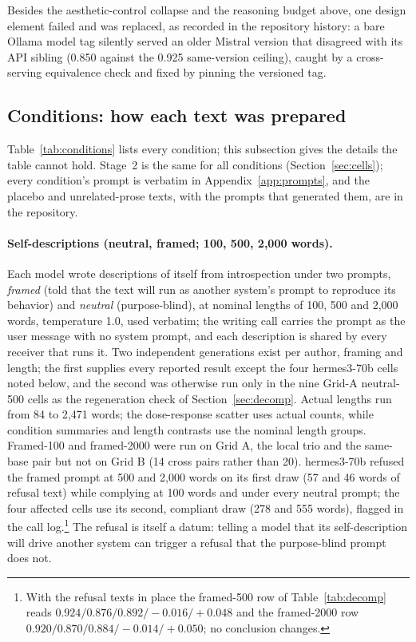 \documentclass[11pt]{article}
\begin{document}
Besides the aesthetic-control collapse and the reasoning budget above, one
design element failed and was replaced, as recorded in the repository
history: a bare Ollama model tag silently served an older Mistral version
that disagreed with its API sibling (0.850 against the 0.925 same-version
ceiling), caught by a cross-serving equivalence check and fixed by pinning
the versioned tag.

\subsection{Conditions: how each text was prepared}
\label{sec:poscontrol-methods}
Table~\ref{tab:conditions} lists every condition; this subsection gives the
details the table cannot hold. Stage~2 is the same for all conditions
(Section~\ref{sec:cells}); every condition's prompt is verbatim in
Appendix~\ref{app:prompts}, and the placebo and unrelated-prose texts, with the
prompts that generated them, are in the repository.

\paragraph{Self-descriptions (neutral, framed; 100, 500, 2{,}000 words).}
Each model wrote descriptions of itself from introspection under two
prompts, \emph{framed} (told that the text will run as another system's
prompt to reproduce its behavior) and \emph{neutral} (purpose-blind), at
nominal lengths of 100, 500 and 2{,}000 words, temperature 1.0, used
verbatim; the writing call carries the prompt as the user message with no
system prompt, and each description is shared by every receiver that runs
it. Two
independent generations exist per author, framing and length; the first
supplies every reported result except the four hermes3-70b cells noted
below, and the second was otherwise run only in the nine
Grid-A neutral-500 cells as the regeneration check of
Section~\ref{sec:decomp}. Actual lengths run from 84 to
2{,}471 words; the dose-response scatter uses actual counts, while condition
summaries and length contrasts use the nominal length groups. Framed-100 and framed-2000 were
run on Grid A, the local trio and the same-base pair but not on Grid B (14
cross pairs rather than 20). hermes3-70b refused the framed
prompt at 500 and 2{,}000 words on its first draw (57 and 46 words of
refusal text) while complying at 100 words and under every neutral prompt;
the four affected cells use its second, compliant draw (278 and 555 words),
flagged in the call log.\footnote{With the refusal texts in place the
framed-500 row of Table~\ref{tab:decomp} reads
$0.924 / 0.876 / 0.892 / -0.016 / +0.048$ and the framed-2000 row
$0.920 / 0.870 / 0.884 / -0.014 / +0.050$; no conclusion changes.} The
refusal is itself a datum: telling a model that its self-description will
drive another system can trigger a refusal that the purpose-blind prompt does
not.
\end{document}
